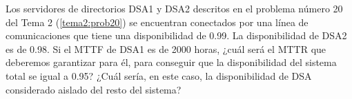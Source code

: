 \begin{problem}[10]
Los servidores de directorios DSA1 y DSA2 descritos en el problema número 20 del Tema 2 (\ref{tema2:prob20}) se encuentran conectados por una línea de comunicaciones que tiene una disponibilidad de 0.99. La disponibilidad de DSA2 es de 0.98. Si el MTTF de DSA1 es de 2000 horas, ¿cuál será el MTTR que deberemos garantizar para él, para conseguir que la disponibilidad del sistema total se igual a 0.95? ¿Cuál sería, en este caso, la disponibilidad de DSA considerado aislado del resto del sistema?

\solution


\end{problem}

